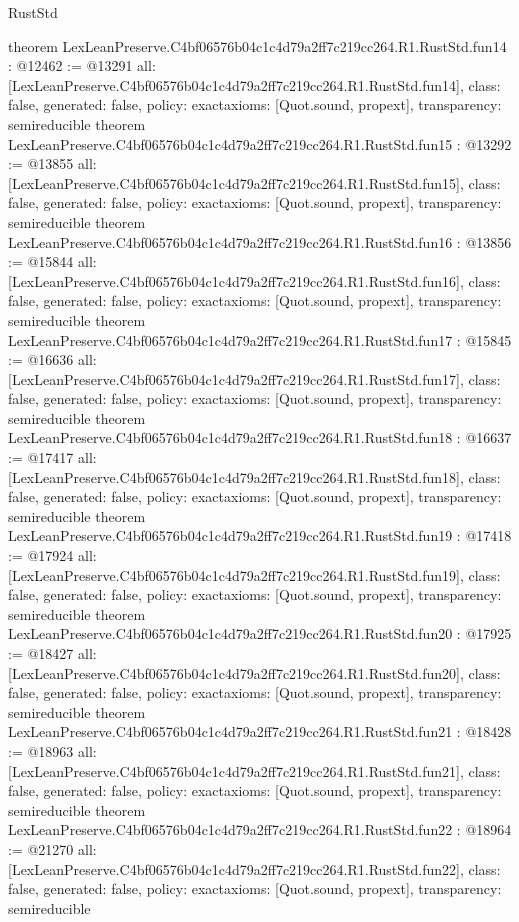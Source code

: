 \begin{lexlean}{RustStd}
\begin{coremodule}
{}
theorem LexLeanPreserve.C4bf06576b04c1c4d79a2ff7c219cc264.R1.RustStd.fun14 : @12462 := @13291 {
  all: [LexLeanPreserve.C4bf06576b04c1c4d79a2ff7c219cc264.R1.RustStd.fun14],
  class: false,
  generated: false,
  policy: exact{axioms: [Quot.sound, propext]},
  transparency: semireducible
}
theorem LexLeanPreserve.C4bf06576b04c1c4d79a2ff7c219cc264.R1.RustStd.fun15 : @13292 := @13855 {
  all: [LexLeanPreserve.C4bf06576b04c1c4d79a2ff7c219cc264.R1.RustStd.fun15],
  class: false,
  generated: false,
  policy: exact{axioms: [Quot.sound, propext]},
  transparency: semireducible
}
theorem LexLeanPreserve.C4bf06576b04c1c4d79a2ff7c219cc264.R1.RustStd.fun16 : @13856 := @15844 {
  all: [LexLeanPreserve.C4bf06576b04c1c4d79a2ff7c219cc264.R1.RustStd.fun16],
  class: false,
  generated: false,
  policy: exact{axioms: [Quot.sound, propext]},
  transparency: semireducible
}
theorem LexLeanPreserve.C4bf06576b04c1c4d79a2ff7c219cc264.R1.RustStd.fun17 : @15845 := @16636 {
  all: [LexLeanPreserve.C4bf06576b04c1c4d79a2ff7c219cc264.R1.RustStd.fun17],
  class: false,
  generated: false,
  policy: exact{axioms: [Quot.sound, propext]},
  transparency: semireducible
}
theorem LexLeanPreserve.C4bf06576b04c1c4d79a2ff7c219cc264.R1.RustStd.fun18 : @16637 := @17417 {
  all: [LexLeanPreserve.C4bf06576b04c1c4d79a2ff7c219cc264.R1.RustStd.fun18],
  class: false,
  generated: false,
  policy: exact{axioms: [Quot.sound, propext]},
  transparency: semireducible
}
theorem LexLeanPreserve.C4bf06576b04c1c4d79a2ff7c219cc264.R1.RustStd.fun19 : @17418 := @17924 {
  all: [LexLeanPreserve.C4bf06576b04c1c4d79a2ff7c219cc264.R1.RustStd.fun19],
  class: false,
  generated: false,
  policy: exact{axioms: [Quot.sound, propext]},
  transparency: semireducible
}
theorem LexLeanPreserve.C4bf06576b04c1c4d79a2ff7c219cc264.R1.RustStd.fun20 : @17925 := @18427 {
  all: [LexLeanPreserve.C4bf06576b04c1c4d79a2ff7c219cc264.R1.RustStd.fun20],
  class: false,
  generated: false,
  policy: exact{axioms: [Quot.sound, propext]},
  transparency: semireducible
}
theorem LexLeanPreserve.C4bf06576b04c1c4d79a2ff7c219cc264.R1.RustStd.fun21 : @18428 := @18963 {
  all: [LexLeanPreserve.C4bf06576b04c1c4d79a2ff7c219cc264.R1.RustStd.fun21],
  class: false,
  generated: false,
  policy: exact{axioms: [Quot.sound, propext]},
  transparency: semireducible
}
theorem LexLeanPreserve.C4bf06576b04c1c4d79a2ff7c219cc264.R1.RustStd.fun22 : @18964 := @21270 {
  all: [LexLeanPreserve.C4bf06576b04c1c4d79a2ff7c219cc264.R1.RustStd.fun22],
  class: false,
  generated: false,
  policy: exact{axioms: [Quot.sound, propext]},
  transparency: semireducible
}
\end{coremodule}
\end{lexlean}
